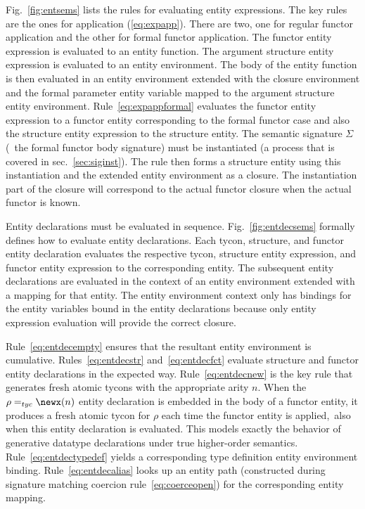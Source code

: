 Fig.~\ref{fig:entsems} lists the rules for evaluating entity expressions. The key rules are the ones for application (\ref{eq:expapp}). There are two, one for regular functor application and the other for formal functor application. The functor entity expression is evaluated to an entity function. The argument structure entity expression is evaluated to an entity environment. The body of the entity function is then evaluated in an entity environment extended with the closure environment and the formal parameter entity variable mapped to the argument structure entity environment. Rule~\ref{eq:expappformal} evaluates the functor entity expression to a functor entity corresponding to the formal functor case and also the structure entity expression to the structure entity. The semantic signature $\Sigma$ (\ie~the formal functor body signature) must be instantiated (a process that is covered in sec.~\ref{sec:siginst}). The rule then forms a structure entity using this instantiation and the extended entity environment as a closure. The instantiation part of the closure will correspond to the actual functor closure when the actual functor is known. 


Entity declarations must be evaluated in
sequence. Fig.~\ref{fig:entdecsems} formally defines how to evaluate
entity declarations. Each tycon, structure, and functor entity declaration evaluates the respective tycon, structure entity expression, and functor entity expression to the corresponding entity. The subsequent entity declarations are evaluated in the context of an entity environment extended with a mapping for that entity. The entity environment context only has bindings for the entity variables bound in the entity declarations because only entity expression evaluation will provide the correct closure.

Rule~\ref{eq:entdecempty} ensures that the resultant entity
environment is cumulative. Rules~\ref{eq:entdecstr}
and~\ref{eq:entdecfct} evaluate structure and functor entity
declarations in the expected way.  Rule~\ref{eq:entdecnew} is the key
rule that generates fresh atomic tycons with the appropriate arity
$n$. When the $\rho=_{tyc}\newx(n)$ entity declaration is embedded in
the body of a functor entity, it produces a fresh atomic tycon for
$\rho$ each time the functor entity is applied,\ie~also when this
entity declaration is evaluated. This models exactly the behavior of
generative datatype declarations under true higher-order
semantics. Rule~\ref{eq:entdectypedef} yields a corresponding type
definition entity environment binding. Rule~\ref{eq:entdecalias} looks
up an entity path (constructed during signature matching coercion
rule~\ref{eq:coerceopen}) for the corresponding entity mapping. 
  
